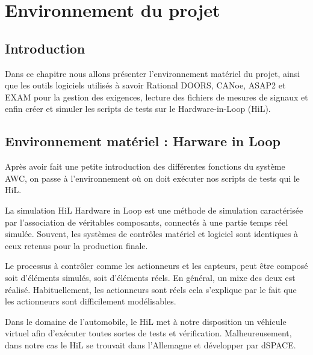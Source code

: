 \chapter{Environnement du projet}
\section*{Introduction}

Dans ce chapitre nous allons présenter l'environnement matériel du projet, ainsi que les outils logiciels utilisés à savoir Rational DOORS, CANoe, ASAP2 et EXAM pour la gestion des exigences, lecture des fichiers de mesures de signaux et enfin créer et simuler les scripts de tests sur le Hardware-in-Loop (HiL).

\section{Environnement matériel : Harware in Loop}

Après avoir fait une petite introduction des différentes fonctions du système AWC, on passe à l’environnement où on doit exécuter nos scripts de tests qui le HiL.

La simulation HiL Hardware in Loop est une méthode de simulation caractérisée par l’association de véritables composants, connectés à une partie temps réel simulée. Souvent, les systèmes de contrôles matériel et logiciel sont identiques à ceux retenus pour la production finale. 

Le processus à contrôler comme les actionneurs et les capteurs, peut être composé soit d’éléments simulés, soit d’éléments réels. En général, un mixe des deux est réalisé. Habituellement, les actionneurs sont réels cela s’explique par le fait que les actionneurs sont difficilement modélisables.

Dans le domaine de l’automobile, le HiL met à notre disposition un véhicule virtuel afin d’exécuter toutes sortes de tests et vérification. Malheureusement, dans notre cas le HiL se trouvait dans l’Allemagne et développer par dSPACE.

